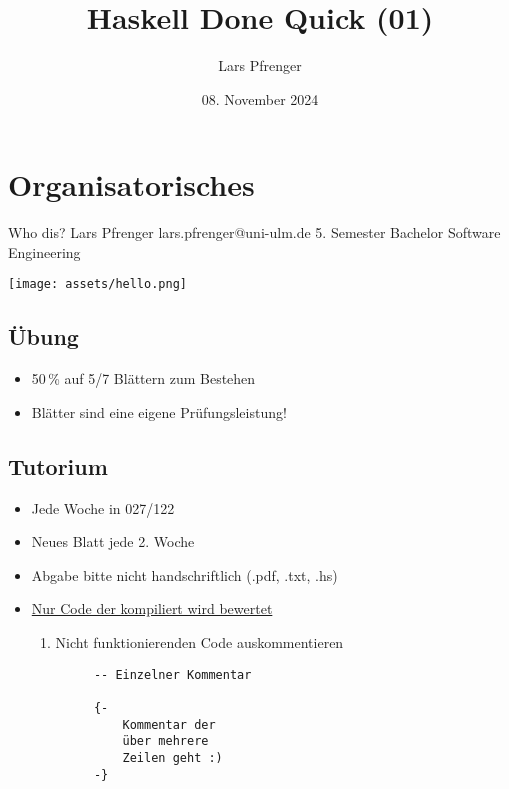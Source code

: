 \documentclass[
	aspectratio=169, 
	10pt 
]{beamer}
\title{Haskell Done Quick (01)}
\author{Lars Pfrenger}
\date{08. November 2024}
\begin{document}
\maketitle

\section{Organisatorisches}
\begin{frame}{Who dis?}
	\faAt \mbox{} Lars Pfrenger\break 
	\faEnvelope \mbox{} lars.pfrenger@uni-ulm.de\break
	\faGraduationCap \mbox{} 5. Semester Bachelor Software Engineering 
	
	\begin{flushright}
        \texttt{[image: assets/hello.png]} %
    \end{flushright}

\end{frame}

\subsection{Übung}
\begin{frame}{\insertsubsection}
	\begin{itemize}
		\item 50\,\% auf 5/7 Blättern zum Bestehen
		\item Blätter sind eine eigene Prüfungsleistung!
	\end{itemize}
\end{frame}

\subsection{Tutorium}
\begin{frame}[fragile]{\insertsubsection}
	\begin{fancycolumns}[T,widths={60,40}]
		\begin{itemize}
			\item Jede Woche in 027/122
			\item Neues Blatt jede 2. Woche
			\item Abgabe bitte nicht handschriftlich \break (.pdf, .txt, .hs)
			\item \underline{Nur Code der kompiliert wird bewertet} \begin{enumerate}[$\rightarrow$]
				\item Nicht funktionierenden Code auskommentieren
			\end{enumerate}
		\end{itemize}
		\nextcolumn
		\begin{verbatim}
			-- Einzelner Kommentar

			{- 
				Kommentar der
				über mehrere  
				Zeilen geht :)
			-}
		\end{verbatim}
	\end{fancycolumns}
\end{frame}
\end{document}
